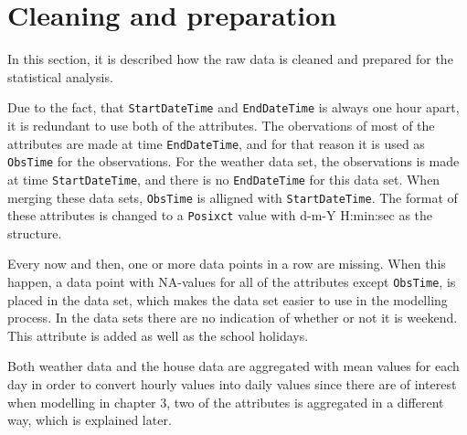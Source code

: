 

\section{Cleaning and preparation}
In this section, it is described how the raw data is cleaned and prepared for the statistical analysis. 

\noindent Due to the fact, that \texttt{StartDateTime} and \texttt{EndDateTime} is always one hour apart, it is redundant to use both of the attributes. The obervations of most of the attributes are made at time \texttt{EndDateTime}, and for that reason it is used as \texttt{ObsTime} for the observations. For the weather data set, the observations is made at time \texttt{StartDateTime}, and there is no \texttt{EndDateTime} for this data set. When merging these data sets, \texttt{ObsTime} is alligned with \texttt{StartDateTime}. The format of these attributes is changed to a \texttt{Posixct} value with d-m-Y H:min:sec as the structure.

\noindent Every now and then, one or more data points in a row are missing. When this happen, a data point with NA-values for all of the attributes except \texttt{ObsTime}, is placed in the data set, which makes the data set easier to use in the modelling process. In the data sets there are no indication of whether or not it is weekend. This attribute is added as well as the school holidays.

\noindent Both weather data and the house data are aggregated with mean values for each day in order to convert hourly values into daily values since there are of interest when modelling in chapter 3, two of the attributes is aggregated in a different way, which is explained later.




